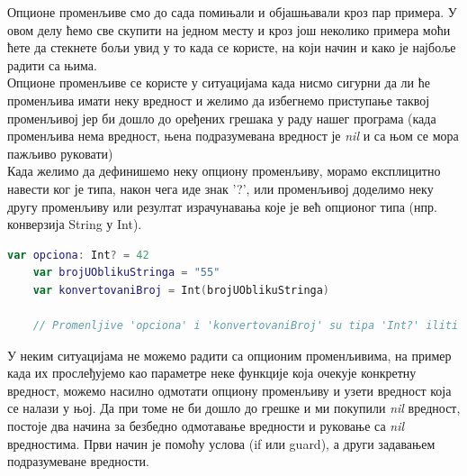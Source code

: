 \documentclass[12pt,oneside]{memoir}
\begin{document}
\indent Опционе променљиве смо до сада помињали и објашњавали кроз пар примера. У овом делу ћемо све скупити на једном месту и кроз још неколико примера моћи ћете да стекнете бољи увид у то када се користе, на који начин и како је најбоље радити са њима. 
\\
\indent Опционе променљиве се користе у ситуацијама када нисмо сигурни да ли ће променљива имати неку вредност и желимо да избегнемо приступање таквој променљивој јер би дошло до оређених грешака у раду нашег програма (када променљива нема вредност, њена подразумевана вредност је \textit{nil} и са њом се мора пажљиво руковати) 
\\
\indent Када желимо да дефинишемо неку опциону променљиву, морамо експлицитно навести ког је типа, након чега иде знак '?', или променљивој доделимо неку другу променљиву или резултат израчунавања које је већ опционог типа (нпр. конверзија String у Int).  

\begin{lstlisting}[caption=\textit{{Дефинисање опционе променљиве}}, label={lst:Дефинисање опционе променљиве}, language=Swift, frame=single]
    var opciona: Int? = 42
    var brojUOblikuStringa = "55"
    var konvertovaniBroj = Int(brojUOblikuStringa) 
    
    // Promenljive 'opciona' i 'konvertovaniBroj' su tipa 'Int?' iliti 'opcioni Int'
\end{lstlisting}

\indent У неким ситуацијама не можемо радити са опционим променљивима, на пример када их прослеђујемо као параметре неке функције која очекује конкретну вредност, можемо насилно одмотати опциону променљиву и узети вредност која се налази у њој. Да при томе не би дошло до грешке и ми покупили \textit{nil} вредност, постоје два начина за безбедно одмотавање вредности и руковање са \textit{nil} вредностима.
Први начин је помоћу услова (if или guard), а други задавањем подразумеване вредности.
\end{document}
